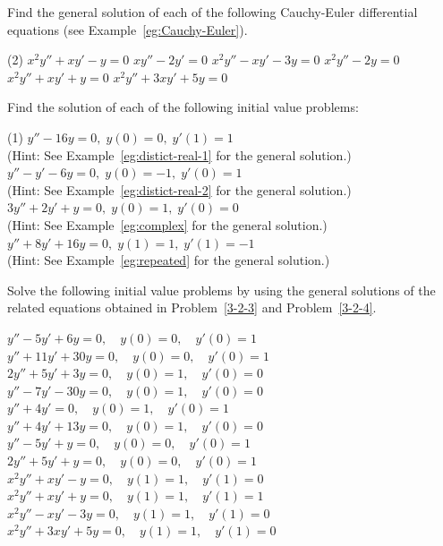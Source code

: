 \begin{Exercise}
 	
 	
\Question\label{3-2-3}
 	Find the general solution of each of the following Cauchy-Euler differential  equations (see Example~\ref{eg:Cauchy-Euler}).
 	
 	\begin{tasks}(2)
 		\task \(x^2y''+xy'-y = 0\)
 		\task \(x y''-2y'=0\)
 		\task \(x^2 y''-x y'-3y=0\)
 		\task \(x^2 y''-2y=0\)
 		\task \(x^2 y''+x y'+y=0\)
 		\task \(x^2y''+3xy'+5y = 0\)
 	\end{tasks}
 	
% 	

\Question\label{3-2-4}
Find the solution of each of the following initial value problems:
\begin{tasks}(1) 
	\task  \(y''-16y =0,\; y(0)= 0, \; y'(1) = 1\)\\ (Hint: See Example~\ref{eg:distict-real-1} for the general solution.)
	\task \( y''-y'-6y = 0, \;y(0)= -1, \; y'(0) = 1\)\\ (Hint: See Example~\ref{eg:distict-real-2} for the general solution.)
	\task \(3y''+2y'+y=0,\; y(0)=1,\; y'(0)=0\)\\ (Hint: See Example~\ref{eg:complex} for the general solution.)
	\task \(y''+8y'+16y = 0,\; y(1)=1,\; y'(1)=-1\)\\  (Hint: See Example~\ref{eg:repeated} for the general solution.)
\end{tasks}
% 
 \Question\label{3-2-5} Solve the following initial value problems by using the general solutions of the related equations obtained in Problem~\ref{3-2-3} and Problem~\ref{3-2-4}.
 \begin{tasks}
 \task \(y''-5y'+6y=0, \quad y(0) = 0, \quad y'(0)=1\)
 \task \(y''+11y'+30y=0, \quad y(0) = 0, \quad y'(0)=1\)
 \task \(2y''+5y'+3y=0, \quad y(0) = 1, \quad y'(0)=0\)
 \task \(y''-7y'-30y=0, \quad y(0) = 1, \quad y'(0)=0\)
 \task \(y''+4y'=0, \quad y(0) = 1, \quad y'(0)=1\)
 \task \(y''+4y'+13y=0, \quad y(0) = 1, \quad y'(0)=0\)
 \task \(y''-5y'+y=0, \quad y(0) = 0, \quad y'(0)=1\)
 \task \(2y''+5y'+y=0, \quad y(0) = 0, \quad y'(0)=1\)
 \task \(x^2y''+xy'-y = 0, \quad y(1) = 1, \quad y'(1)=0\)
 \task \(x^2 y''+x y'+y=0, \quad y(1) = 1, \quad y'(1)=1\)
 \task \(x^2 y''-x y'-3y=0, \quad y(1) = 1, \quad y'(1)=0\)
 \task \(x^2y''+3xy'+5y = 0,\quad y(1) = 1, \quad y'(1)=0\)
 \end{tasks}
 	

\end{Exercise}
